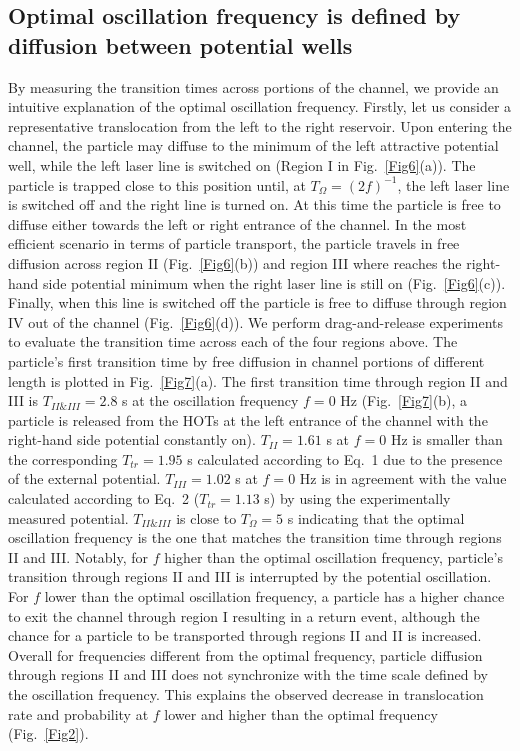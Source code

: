 \documentclass[
 reprint,
 aps, showkeys, showpacs
]{revtex4-1}
\begin{document}
\subsection{Optimal oscillation frequency is defined by diffusion between potential wells}
By measuring the transition times across portions of the channel, we provide an intuitive explanation of the optimal oscillation frequency. Firstly, let us consider a representative translocation from the left to the right reservoir. Upon entering the channel, the particle may diffuse to the minimum of the left attractive potential well, while the left laser line is switched on (Region I in Fig.~\ref{Fig6}(a)). The particle is trapped close to this position until, at $T_{\Omega} = (2f)^{-1}$, the left laser line is switched off and the right line is turned on. At this time the particle is free to diffuse either towards the left or right entrance of the channel. In the most efficient scenario in terms of particle transport, the particle travels in free diffusion across region II (Fig.~\ref{Fig6}(b)) and region III where reaches the right-hand side potential minimum when the right laser line is still on (Fig.~\ref{Fig6}(c)). Finally, when this line is switched off the particle is free to diffuse through region IV out of the channel (Fig.~\ref{Fig6}(d)). We perform drag-and-release experiments to evaluate the transition time across each of the four regions above. The particle's first transition time by free diffusion in channel portions of different length is plotted in Fig.~\ref{Fig7}(a). The first transition time through region II and III is $T_{II \& III}=2.8$ s at the oscillation frequency $f = 0$ Hz (Fig.~\ref{Fig7}(b), a particle is released from the HOTs at the left entrance of the channel with the right-hand side potential constantly on). $T_{II}=1.61$ s at $f = 0$ Hz is smaller than the corresponding $T_{tr}=1.95$ s calculated according to Eq.~1 due to the presence of the external potential. $T_{III}=1.02$ s at $f = 0$ Hz is in agreement with the value calculated according to Eq.~2 ($T_{tr} = 1.13$ s) by using the experimentally measured potential. $T_{II \& III}$ is close to $T_{\Omega}=5$ s indicating that the optimal oscillation frequency is the one that matches the transition time through regions II and III. Notably, for $f$ higher than the optimal oscillation frequency, particle's transition through regions II and III is interrupted by the potential oscillation. For $f$ lower than the optimal oscillation frequency, a particle has a higher chance to exit the channel through region I resulting in a return event, although the chance for a particle to be transported through regions II and II is increased. Overall for frequencies different from the optimal frequency,  particle diffusion through regions II and III does not synchronize with the time scale defined by the oscillation frequency. This explains the observed decrease in translocation rate and probability at  $f$ lower and higher than the optimal frequency (Fig.~\ref{Fig2}). 
\end{document}
